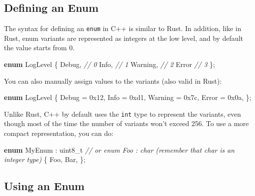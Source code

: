 \documentclass[
]{book}
\newenvironment{Shaded}{\begin{snugshade}}{\end{snugshade}}
\newcommand{\BaseNTok}[1]{\textcolor[rgb]{0.00,0.00,0.81}{#1}}
\newcommand{\CommentTok}[1]{\textcolor[rgb]{0.56,0.35,0.01}{\textit{#1}}}
\newcommand{\DataTypeTok}[1]{\textcolor[rgb]{0.13,0.29,0.53}{#1}}
\newcommand{\KeywordTok}[1]{\textcolor[rgb]{0.13,0.29,0.53}{\textbf{#1}}}
\newcommand{\NormalTok}[1]{#1}
\begin{document}
\hypertarget{defining-an-enum}{%
\subsection{Defining an Enum}\label{defining-an-enum}}

The syntax for defining an \texttt{enum} in C++ is similar to Rust. In addition, like in Rust, enum
variants are represented as integers at the low level, and by default the value starts from 0.

\begin{Shaded}
\begin{Highlighting}[]
\KeywordTok{enum}\NormalTok{ LogLevel}
\NormalTok{\{}
\NormalTok{    Debug,   }\CommentTok{// 0}
\NormalTok{    Info,    }\CommentTok{// 1}
\NormalTok{    Warning, }\CommentTok{// 2}
\NormalTok{    Error    }\CommentTok{// 3}
\NormalTok{\};}
\end{Highlighting}
\end{Shaded}

You can also manually assign values to the variants (also valid in Rust):

\begin{Shaded}
\begin{Highlighting}[]
\KeywordTok{enum}\NormalTok{ LogLevel}
\NormalTok{\{}
\NormalTok{    Debug   = }\BaseNTok{0x12}\NormalTok{,}
\NormalTok{    Info    = }\BaseNTok{0xd1}\NormalTok{,}
\NormalTok{    Warning = }\BaseNTok{0x7c}\NormalTok{,}
\NormalTok{    Error   = }\BaseNTok{0x0a}\NormalTok{,}
\NormalTok{\};}
\end{Highlighting}
\end{Shaded}

Unlike Rust, C++ by default uses the \texttt{int} type to represent the variants, even though most of the
time the number of variants won't exceed 256. To use a more compact representation, you can do:

\begin{Shaded}
\begin{Highlighting}[]
\KeywordTok{enum}\NormalTok{ MyEnum : }\DataTypeTok{uint8\_t}
\CommentTok{// or \textasciigrave{}enum Foo : char\textasciigrave{} (remember that \textasciigrave{}char\textasciigrave{} is an integer type)}
\NormalTok{\{}
\NormalTok{    Foo,}
\NormalTok{    Bar,}
\NormalTok{\};}
\end{Highlighting}
\end{Shaded}

\hypertarget{using-an-enum}{%
\subsection{Using an Enum}\label{using-an-enum}}
\end{document}
